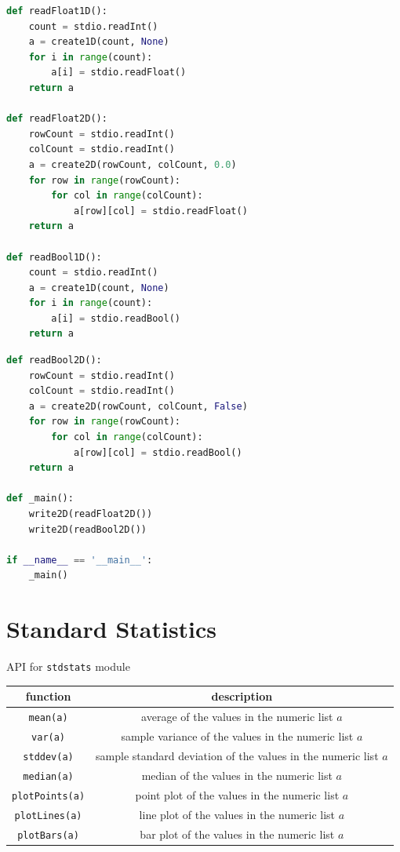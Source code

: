 \documentclass[8pt,a4paper,compress]{beamer}
\begin{document}
\begin{frame}[fragile]
\pause

\begin{lstlisting}[language=Python]
def readFloat1D():
    count = stdio.readInt()
    a = create1D(count, None)
    for i in range(count):
        a[i] = stdio.readFloat()
    return a

def readFloat2D():
    rowCount = stdio.readInt()
    colCount = stdio.readInt()
    a = create2D(rowCount, colCount, 0.0)
    for row in range(rowCount):
        for col in range(colCount):
            a[row][col] = stdio.readFloat()
    return a

def readBool1D():
    count = stdio.readInt()
    a = create1D(count, None)
    for i in range(count):
        a[i] = stdio.readBool()
    return a
\end{lstlisting}
\end{frame}


\begin{frame}[fragile]
\pause

\begin{lstlisting}[language=Python]
def readBool2D():
    rowCount = stdio.readInt()
    colCount = stdio.readInt()
    a = create2D(rowCount, colCount, False)
    for row in range(rowCount):
        for col in range(colCount):
            a[row][col] = stdio.readBool()
    return a

def _main():
    write2D(readFloat2D())
    write2D(readBool2D())

if __name__ == '__main__':
    _main()
\end{lstlisting}
\end{frame}

\section{Standard Statistics}
\begin{frame}[fragile]
\pause

API for \lstinline{stdstats} module
\begin{center}
\begin{tabular}{cc}
function & description \\ \hline
\lstinline$mean(a)$ & average of the values in the numeric list $a$ \\
\lstinline$var(a)$ & sample variance of the values in the numeric list $a$ \\
\lstinline$stddev(a)$ & sample standard deviation of the values in the numeric list $a$ \\
\lstinline$median(a)$ & median of the values in the numeric list $a$ \\
\lstinline$plotPoints(a)$ & point plot of the values in the numeric list $a$ \\
\lstinline$plotLines(a)$ & line plot of the values in the numeric list $a$ \\
\lstinline$plotBars(a)$ & bar plot of the values in the numeric list $a$
\end{tabular} 
\end{center}
\end{frame}
\end{document}
